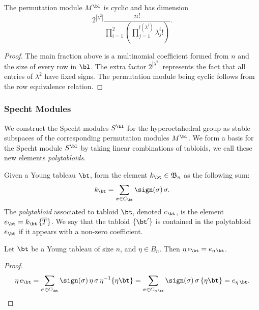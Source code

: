 \documentclass[11pt]{report}
\begin{document}
\begin{lemma}
	The permutation module $M^{\bl}$ is cyclic and has dimension
	\[	2^{|\lambda^{2}|}\frac{n!}{\prod_{i=1}^{2}\left(\prod_{j=1}^{l(\lambda^{i})} \lambda_{j}^{i}! \right)} .\]
\end{lemma}
\begin{proof}
	The main fraction above is a multinomial coefficient formed from $n$ and the size of every row in $\bl$. The extra factor $2^{|\lambda^{2}|}$ represents the fact that all entries of $\lambda^{2}$ have fixed signs. The permutation module being cyclic follows from the row equivalence relation.
\end{proof}

















\subsubsection{Specht Modules}
We construct the Specht modules $S^{\bl}$ for the hyperoctahedral group as stable subspaces of the corresponding permutation modules $M^{\bl}$.
We form a basis for the Specht module $S^{\bl}$ by taking linear combinations of tabloids, we call these new elements \emph{polytabloids}.

\begin{defn}
	Given a Young tableau $\bt$, form the element $k_{\bt} \in \mathfrak{B}_{n}$ as the following sum:
	\begin{eqnarray}
	k_{\bt} = \sum_{\sigma \in C_{\bt}} \sign(\sigma) \, \sigma.
	\end{eqnarray} The \emph{polytabloid} associated to tabloid $\bt$, denoted $e_{\bt}$, is the element $e_{\bt} = k_{\bt} \, \{\overline{T}\}$. We say that the tabloid $\{\bt^{\prime}\}$ is contained in the polytabloid $e_{\bt}$ if it appears with a non-zero coefficient.
\end{defn}

\begin{lemma}
	\label{chpt6:lem:spechtcyclic}
	Let $\bt$ be a Young tableau of size $n$, and $\eta \in B_{n}$. Then $\eta \, e_{\bt} = e_{\eta \, \bt}$.  
\end{lemma}
\begin{proof}
	\begin{eqnarray}
	\eta \, e_{\bt} =  \sum_{\sigma \in C_{\bt}}  \sign(\sigma) \, \eta \,  \sigma \,\eta^{-1} \{\eta \bt\}  =  \sum_{\sigma \in C_{\eta \, \bt}}  \sign(\sigma)  \,  \sigma \, \{\eta \bt\} = e_{\eta \,\bt}. \nonumber \qedhere 
	\end{eqnarray}
\end{proof}
\end{document}

